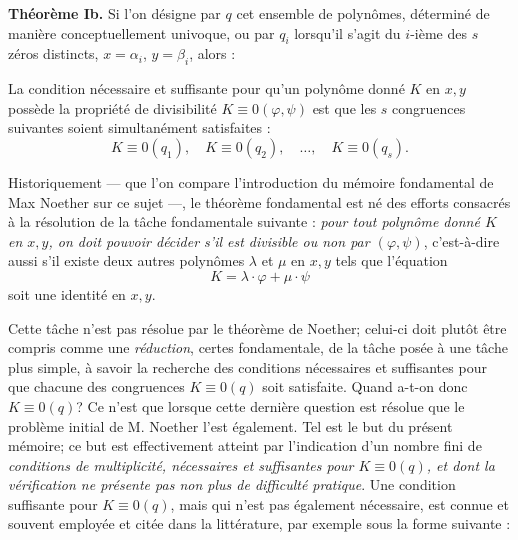 \textbf{Théorème Ib.} Si l'on désigne par $q$ cet ensemble de polynômes, déterminé de manière conceptuellement univoque, ou par $q_i$ lorsqu'il s'agit du $i$-ième des $s$ zéros distincts, $x=\alpha_i$, $y=\beta_i$, alors :

La condition nécessaire et suffisante pour qu'un polynôme donné $K$ en $x,y$ possède la propriété de divisibilité $K\equiv0(\varphi,\psi)$ est que les $s$ congruences suivantes soient simultanément satisfaites :
\[
K\equiv0(q_1),\quad K\equiv0(q_2),\quad\ldots,\quad K\equiv0(q_s).
\]

Historiquement --- que l'on compare l'introduction du mémoire fondamental de Max Noether sur ce sujet ---, le théorème fondamental est né des efforts consacrés à la résolution de la tâche fondamentale suivante : \emph{pour tout polynôme donné $K$ en $x,y$, on doit pouvoir décider s'il est divisible ou non par $(\varphi,\psi)$}, c'est-à-dire aussi s'il existe deux autres polynômes $\lambda$ et $\mu$ en $x,y$ tels que l'équation
\[
K=\lambda\cdot\varphi+\mu\cdot\psi
\]
soit une identité en $x,y$.

Cette tâche n'est pas résolue par le théorème de Noether; celui-ci doit plutôt être compris comme une \emph{réduction}, certes fondamentale, de la tâche posée à une tâche plus simple, à savoir la recherche des conditions nécessaires et suffisantes pour que chacune des congruences $K\equiv0(q)$ soit satisfaite. Quand a-t-on donc $K\equiv0(q)$? Ce n'est que lorsque cette dernière question est résolue que le problème initial de M. Noether l'est également. Tel est le but du présent mémoire; ce but est effectivement atteint par l'indication d'un nombre fini de \emph{conditions de multiplicité, nécessaires et suffisantes pour $K\equiv0(q)$, et dont la vérification ne présente pas non plus de difficulté pratique}. Une condition suffisante pour $K\equiv0(q)$, mais qui n'est pas également nécessaire, est connue et souvent employée et citée dans la littérature, par exemple sous la forme suivante :

